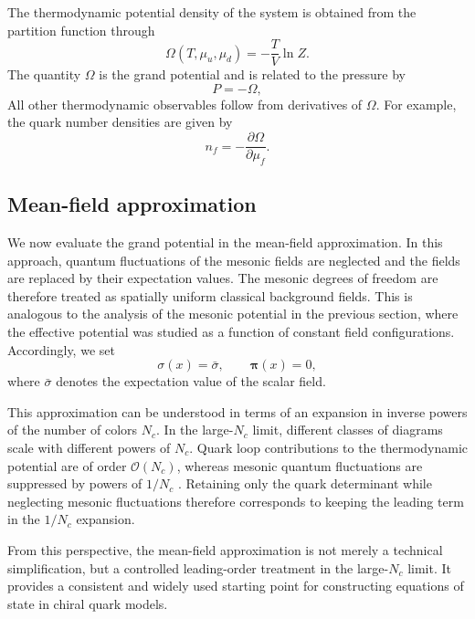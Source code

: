 The thermodynamic potential density of the system is obtained from the
partition function through
\begin{equation}
\Omega(T,\mu_u,\mu_d)
=
- \frac{T}{V}\ln Z .
\end{equation}
The quantity $\Omega$ is the grand potential and is related to
the pressure by
\begin{equation}
P = -\Omega ,
\end{equation}
All other thermodynamic observables follow from derivatives of
$\Omega$. For example, the quark number densities are given by
\begin{equation}
n_f = -
\frac{\partial \Omega}{\partial \mu_f} .
\end{equation}

\subsection*{Mean-field approximation}
\label{subsec:mean_field_approx}

We now evaluate the grand potential in the mean-field approximation.
In this approach, quantum fluctuations of the mesonic fields are
neglected and the fields are replaced by their expectation values.
The mesonic degrees of freedom are therefore treated as spatially
uniform classical background fields.
This is analogous to the analysis of the mesonic potential in the
previous section, where the effective potential was studied as a
function of constant field configurations.
Accordingly, we set
\begin{equation}
\sigma(x) = \bar{\sigma},
\qquad
\boldsymbol{\pi}(x) = 0 ,
\end{equation}
where $\bar{\sigma}$ denotes the expectation value of the scalar field.

This approximation can be understood in terms of an expansion in
inverse powers of the number of colors $N_c$.
In the large-$N_c$ limit, different classes of diagrams scale with
different powers of $N_c$.
Quark loop contributions to the thermodynamic potential are of order
$\mathcal{O}(N_c)$, whereas mesonic quantum fluctuations are suppressed
by powers of $1/N_c$ \cite{SchaeferWambach2008,Buballa2005}.
Retaining only the quark determinant while neglecting mesonic
fluctuations therefore corresponds to keeping the leading term in the
$1/N_c$ expansion.

From this perspective, the mean-field approximation is not merely a
technical simplification, but a controlled leading-order treatment in
the large-$N_c$ limit.
It provides a consistent and widely used starting point for constructing
equations of state in chiral quark models.

